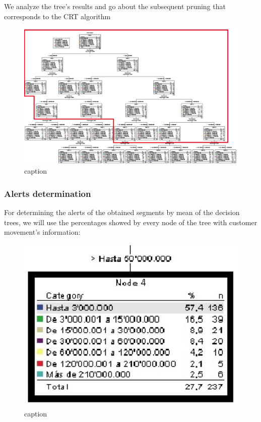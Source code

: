 We analyze the tree’s results and go about the subsequent pruning that corresponds to the CRT algorithm

\begin{figure}[ht!]
  \centering
  \includegraphics[scale=0.55]{arbolpodado}
  \caption{caption}

\end{figure}
\newpage
\subsubsection{Alerts determination}
For determining the alerts of the obtained segments by mean of the decision trees, we will use the percentages showed by every node of the tree with customer movement’s information:

\begin{figure}[ht]
  \centering
  \includegraphics[scale=0.7]{Segmentoejemplo}
  \caption{caption}
\end{figure}


